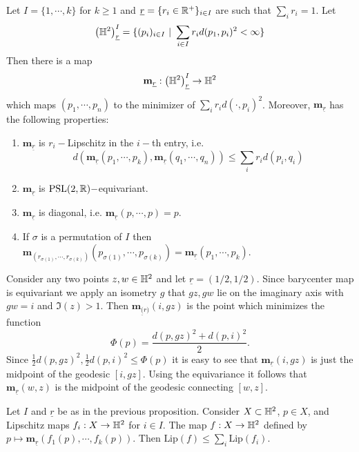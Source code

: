\begin{proposition}
  Let $I = \{1,\cdots, k\}$ for $k\geq 1$ and $\underline{r} = \{r_i\in \mathbb{R}^+\}_{i\in I}$ are such that $\sum_i r_i = 1$. Let 
  $$\left(\mathbb{H}^2\right)^I_{\underline{r}} = \{(p_i)_{i\in I}\ |\ \sum_{i\in I}r_i d(p_1,p_i)^2 <\infty\}$$ 
  Then there is a map
  $$\mathbf{m}_{\underline{r}}: \left(\mathbb{H}^2\right)^I_{\underline{r}} \to \mathbb{H}^2$$
  which maps $(p_1,\cdots, p_n)$ to the minimizer of $\sum_i r_i d(\cdot,p_i)^2$. Moreover, $\mathbf{m}_{\underline{r}}$ has the following properties:
  \begin{enumerate}
    \item $\mathbf{m}_{\underline{r}}$ is $r_i-$Lipschitz in the $i-$th entry, i.e.
      $$d(\mathbf{m}_{\underline{r}}(p_1,\cdots,p_k), \mathbf{m}_{\underline{r}}(q_1,\cdots, q_n))\leq \sum_i r_i d(p_i, q_i)$$
    \item $\mathbf{m}_{\underline{r}}$ is $\text{PSL}(2,\mathbb{R})-$equivariant.
    \item $\mathbf{m}_{\underline{r}}$ is diagonal, i.e. $\mathbf{m}_{\underline{r}}(p,\cdots, p) = p$.
    \item If $\sigma$ is a permutation of $I$ then $\mathbf{m}_{(r_{\sigma(1)},\cdots, r_{\sigma(k)})}(p_{\sigma(1)},\cdots, p_{\sigma(k)}) = \mathbf{m}_{\underline{r}}(p_1,\cdots, p_k)$.
  \end{enumerate}
\end{proposition}
\begin{exmp}
  Consider any two points $z, w\in \mathbb{H}^2$ and let $\underline{r} = (1/2,1/2)$. Since barycenter map is equivariant we apply an isometry $g$ that $gz,gw$ lie on the imaginary axis with $gw=i$ and $\Im(z)>1$. Then $\mathbf{m}_{\underline(r)}(i,gz)$ is the point which minimizes the function 
  $$\Phi(p) = \frac{d(p,gz)^2 + d(p,i)^2}{2}.$$
  Since $\frac{1}{2}d(p,gz)^2, \frac{1}{2}d(p,i)^2\leq \Phi(p)$ it is easy to see that $\mathbf{m}_{\underline{r}}(i,gz)$ is just the midpoint of the geodesic $[i,gz]$. Using the equivariance it follows that $\mathbf{m}_{\underline{r}}(w,z)$ is the midpoint of the geodesic connecting $[w,z]$.
\end{exmp}
\begin{proposition}\label{pro:kassel}
  Let $I$ and $\underline{r}$ be as in the previous proposition. Consider $X\subset \mathbb{H}^2$, $p\in X$, and Lipschitz maps $f_i:X\to \mathbb{H}^2$ for $i\in I$. The map $f:X\to \mathbb{H}^2$ defined by $p\mapsto \mathbf{m}_{\underline{r}}(f_1(p),\cdots, f_k(p))$. Then $\text{Lip}(f) \leq \sum_i \text{Lip}(f_i)$.
\end{proposition}
